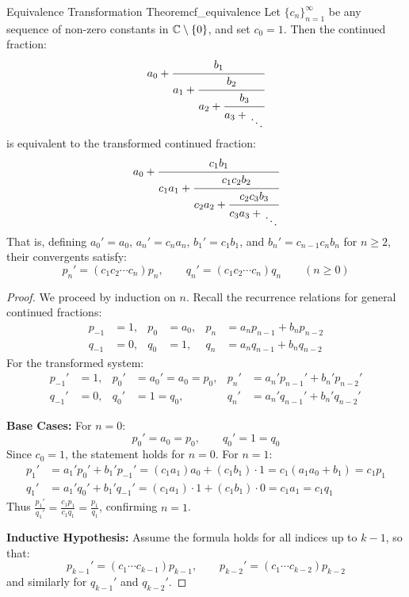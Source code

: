 \documentclass[a4paper]{article}
\begin{document}
\begin{mytheorem}{Equivalence Transformation Theorem}{cf_equivalence}
  Let $\{c_n\}_{n=1}^\infty$ be any sequence of non-zero constants in $\mathbb{C} \setminus \{0\}$, and set $c_0 = 1$.
  Then the continued fraction:
  \[
    a_0 + \cfrac{b_1}{a_1 + \cfrac{b_2}{a_2 + \cfrac{b_3}{a_3 + \CFDots}}}
  \]
  is equivalent to the transformed continued fraction:
  \[
    a_0 + \cfrac{c_1 b_1}{c_1 a_1 + \cfrac{c_1 c_2 b_2}{c_2 a_2 + \cfrac{c_2 c_3 b_3}{c_3 a_3 + \CFDots}}}
  \]
  That is, defining $a_0' = a_0$, $a_n' = c_n a_n$, $b_1' = c_1 b_1$, and $b_n' = c_{n-1} c_n b_n$ for $n \ge 2$, their convergents satisfy:
  \[
    p_n' = (c_1 c_2 \cdots c_n) p_n, \qquad q_n' = (c_1 c_2 \cdots c_n) q_n \qquad (n \ge 0)
  \]

  \begin{proof}
    We proceed by induction on $n$.
    Recall the recurrence relations for general continued fractions:
    \begin{align*}
      p_{-1} & = 1, & p_0 & = a_0, & p_n & = a_n p_{n-1} + b_n p_{n-2} \\
      q_{-1} & = 0, & q_0 & = 1,   & q_n & = a_n q_{n-1} + b_n q_{n-2}
    \end{align*}
    For the transformed system:
    \begin{align*}
      p_{-1}' & = 1, & p_0' & = a_0' = a_0 = p_0, & p_n' & = a_n' p_{n-1}' + b_n' p_{n-2}' \\
      q_{-1}' & = 0, & q_0' & = 1 = q_0,          & q_n' & = a_n' q_{n-1}' + b_n' q_{n-2}'
    \end{align*}

    \textbf{Base Cases:}
    For $n = 0$:
    \[
      p_0' = a_0 = p_0, \qquad q_0' = 1 = q_0
    \]
    Since $c_0 = 1$, the statement holds for $n = 0$.
    For $n = 1$:
    \begin{align*}
      p_1' & = a_1' p_0' + b_1' p_{-1}' = (c_1 a_1) a_0 + (c_1 b_1) \cdot 1 = c_1 (a_1 a_0 + b_1) = c_1 p_1 \\
      q_1' & = a_1' q_0' + b_1' q_{-1}' = (c_1 a_1) \cdot 1 + (c_1 b_1) \cdot 0 = c_1 a_1 = c_1 q_1
    \end{align*}
    Thus $\frac{p_1'}{q_1'} = \frac{c_1 p_1}{c_1 q_1} = \frac{p_1}{q_1}$, confirming $n = 1$.

    \textbf{Inductive Hypothesis:}
    Assume the formula holds for all indices up to $k-1$, so that:
    \[
      p_{k-1}' = (c_1 \cdots c_{k-1}) p_{k-1}, \qquad p_{k-2}' = (c_1 \cdots c_{k-2}) p_{k-2}
    \]
    and similarly for $q_{k-1}'$ and $q_{k-2}'$.


\end{proof}
\end{mytheorem}
\end{document}
